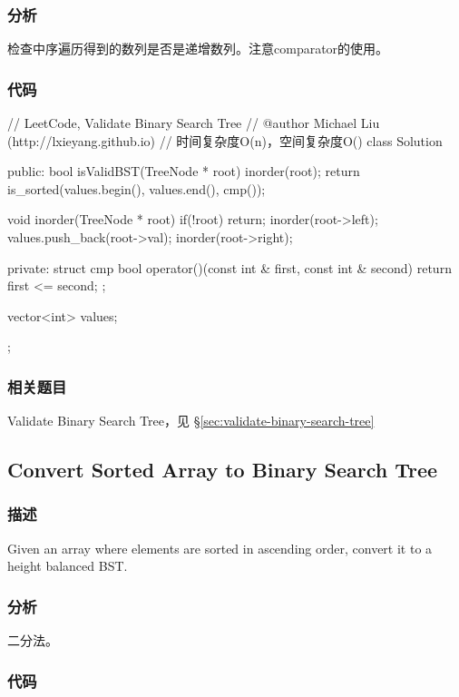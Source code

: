 \subsubsection{分析}
检查中序遍历得到的数列是否是递增数列。注意comparator的使用。

\subsubsection{代码}

\begin{Code}
// LeetCode, Validate Binary Search Tree
// @author Michael Liu (http://lxieyang.github.io)
// 时间复杂度O(n)，空间复杂度O(\logn)
class Solution {
public:
	bool isValidBST(TreeNode * root) {
		inorder(root);
		return is_sorted(values.begin(), values.end(), cmp());
	}
	
	void inorder(TreeNode * root) {
    	if(!root)
    		return;
    	inorder(root->left);
    	values.push_back(root->val);
    	inorder(root->right);
    }
    
private:
	struct cmp {
		bool operator()(const int & first, const int & second) {
			return first <= second;
		}
	};
	
	vector<int> values;
};
\end{Code}


\subsubsection{相关题目}
\begindot
\item Validate Binary Search Tree，见 \S \ref{sec:validate-binary-search-tree}
\myenddot


\subsection{Convert Sorted Array to Binary Search Tree}
\label{sec:convert-sorted-array-to-binary-search-tree}


\subsubsection{描述}
Given an array where elements are sorted in ascending order, convert it to a height balanced BST.


\subsubsection{分析}
二分法。


\subsubsection{代码}

